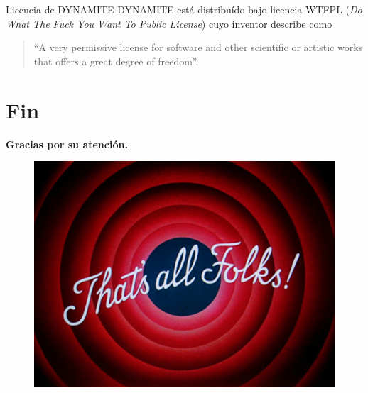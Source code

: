 \documentclass{beamer}
\newcommand{\stframe}[1]{\begin{frame} \begin{center}\Large{\textbf{{#1}}}\end{center}\end{frame}}
\begin{document}

\begin{frame}{Licencia de DYNAMITE}
DYNAMITE está distribuído bajo licencia WTFPL (\textit{Do What The Fuck You Want To Public License}) cuyo inventor describe como
\begin{quote}``A very permissive license for software and other scientific or artistic works that offers a great degree of freedom''.
\end{quote}
\end{frame}

\section{Fin}
\stframe{Gracias por su atención.}

\begin{frame}
\begin{figure} \centering
\includegraphics[scale=0.2]{figures/thats-all-folks.jpg}
\end{figure}
\end{frame}
\end{document}
